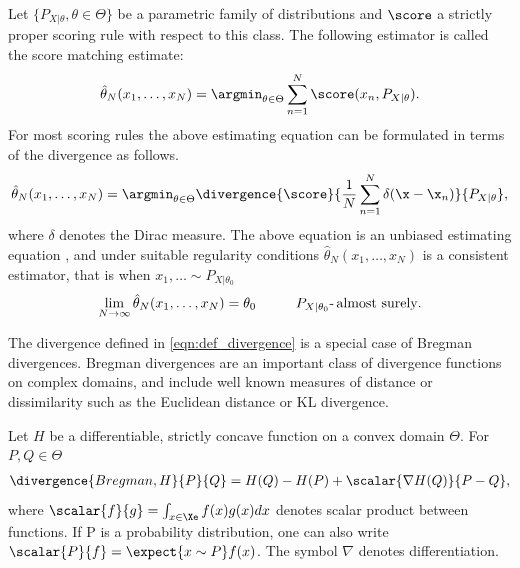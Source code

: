 \begin{definition}\label{def:score_matching}
Let $\{P_{X\vert\theta}, \theta\in\Theta\}$ be a parametric family of distributions and $\score$ a strictly proper scoring rule with respect to this class. The following estimator is called the score matching estimate:
\begin{equation}
	\hat{\theta}_N(x_1,\ldots,x_N) = \argmin_{\theta\in\Theta} \sum_{n=1}^{N}\score(x_n,P_{X\vert\theta}). \label{eqn:score_matching}
\end{equation}
For most scoring rules the above estimating equation can be formulated in terms of the divergence as follows.
\begin{equation}
	\hat{\theta}_N(x_1,\ldots,x_N) = \argmin_{\theta\in\Theta} \divergence{\score}{\frac{1}{N}\sum_{n=1}^{N}\delta(\x-\x_n)}{P_{X\vert\theta}},
\end{equation}
where $\delta$ denotes the Dirac measure. The above equation is an unbiased estimating equation \citep{dawid94scoring}, and under suitable regularity conditions $\hat{\theta}_N(x_1,\ldots,x_N)$ is a consistent estimator, that is when $x_1,\ldots\sim P_{X\vert\theta_0}$ \iid
\begin{equation}
	\lim_{N \rightarrow \infty} \hat{\theta}_N(x_1,\ldots,x_N) = \theta_0\hspace{1cm} P_{X\vert\theta_0}\mbox{-\,almost surely}.
\end{equation}
\end{definition}

The divergence defined in \eqref{eqn:def_divergence} is a special case of Bregman divergences. Bregman divergences are an important class of divergence functions on complex domains, and include well known measures of distance or dissimilarity such as the Euclidean distance or KL divergence.

\begin{definition}
	Let $H$ be a differentiable, strictly concave function on a convex domain $\Theta$. For $P,Q\in\Theta$ 
	\begin{align}
		\divergence{Bregman,H}{P}{Q} = H(Q) - H(P) + \scalar{\nabla H(Q)}{P-Q},
	\end{align}
	where $\scalar{f}{g} = \int_{x\in\Xe} f(x)g(x) dx$ denotes scalar product between functions. If P is a probability distribution, one can also write $\scalar{P}{f} = \expect{x\sim P} f(x)$. The symbol $\nabla$ denotes differentiation.
\end{definition}

